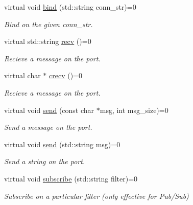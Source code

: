 \begin{DoxyCompactItemize}
\item 
virtual void \hyperlink{classZmqIn_ad6037a187635f7d46bab5da961156751}{bind} (std\+::string conn\+\_\+str)=0\hypertarget{classZmqIn_ad6037a187635f7d46bab5da961156751}{}\label{classZmqIn_ad6037a187635f7d46bab5da961156751}

\begin{DoxyCompactList}\small\item\em Bind on the given conn\+\_\+str. \end{DoxyCompactList}\item 
virtual std\+::string \hyperlink{classZmqIn_a375de593defd4c2cf3adebad063950fe}{recv} ()=0\hypertarget{classZmqIn_a375de593defd4c2cf3adebad063950fe}{}\label{classZmqIn_a375de593defd4c2cf3adebad063950fe}

\begin{DoxyCompactList}\small\item\em Recieve a message on the port. \end{DoxyCompactList}\item 
virtual char $\ast$ \hyperlink{classZmqIn_ad0ff1eaef4590f8937fbc3eb8ba116be}{crecv} ()=0\hypertarget{classZmqIn_ad0ff1eaef4590f8937fbc3eb8ba116be}{}\label{classZmqIn_ad0ff1eaef4590f8937fbc3eb8ba116be}

\begin{DoxyCompactList}\small\item\em Recieve a message on the port. \end{DoxyCompactList}\item 
virtual void \hyperlink{classZmqIn_ad2a35cc76a5b0b2412fda5418f708e60}{send} (const char $\ast$msg, int msg\+\_\+size)=0\hypertarget{classZmqIn_ad2a35cc76a5b0b2412fda5418f708e60}{}\label{classZmqIn_ad2a35cc76a5b0b2412fda5418f708e60}

\begin{DoxyCompactList}\small\item\em Send a message on the port. \end{DoxyCompactList}\item 
virtual void \hyperlink{classZmqIn_adf4165c263ddc5b68099b93b9f37f592}{send} (std\+::string msg)=0\hypertarget{classZmqIn_adf4165c263ddc5b68099b93b9f37f592}{}\label{classZmqIn_adf4165c263ddc5b68099b93b9f37f592}

\begin{DoxyCompactList}\small\item\em Send a string on the port. \end{DoxyCompactList}\item 
virtual void \hyperlink{classZmqIn_a1b7ed3f43e1796a5a0cdd090f69ae932}{subscribe} (std\+::string filter)=0\hypertarget{classZmqIn_a1b7ed3f43e1796a5a0cdd090f69ae932}{}\label{classZmqIn_a1b7ed3f43e1796a5a0cdd090f69ae932}

\begin{DoxyCompactList}\small\item\em Subscribe on a particular filter (only effective for Pub/\+Sub) \end{DoxyCompactList}\end{DoxyCompactItemize}


